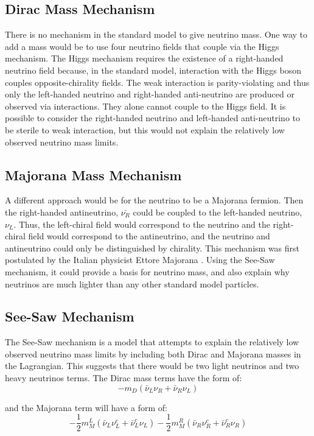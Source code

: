 \subsection{Dirac Mass Mechanism}
There is no mechanism in the standard model to give neutrino mass. One way to add a mass would be to use four neutrino fields that couple via the Higgs mechanism. The Higgs mechanism requires the existence of a right-handed neutrino field because, in the standard model, interaction with the Higgs boson couples opposite-chirality fields. The weak interaction is parity-violating and thus only the left-handed neutrino and right-handed anti-neutrino are produced or observed via interactions. They alone cannot couple to the Higgs field. It is possible to consider the right-handed neutrino and left-handed anti-neutrino to be sterile to weak interaction, but this would not explain the relatively low observed neutrino mass limits. 

\subsection{Majorana Mass Mechanism}
A different approach would be for the neutrino to be a Majorana fermion. Then the right-handed antineutrino, $\bar{\nu_R}$ could be coupled to the left-handed neutrino, $\nu_L$. Thus, the left-chiral field would correspond to the neutrino and the right-chiral field would correspond to the antineutrino, and the neutrino and antineutrino could only be distinguished by chirality. This mechanism was first postulated by the Italian physicist Ettore Majorana \cite{Majorana_1937}. Using the See-Saw mechanism, it could provide a basis for neutrino mass, and also explain why neutrinos are much lighter than any other standard model particles.


\subsection{See-Saw Mechanism}
The See-Saw mechanism is a model that attempts to explain the relatively low observed neutrino mass limits by including both Dirac and Majorana masses in the Lagrangian. This suggests that there would be two light neutrinos and two heavy neutrinos terms. The Dirac mass terms have the form of:
\begin{equation}\label{dirac_mass_terms}
-m_D(\bar{\nu}_L\nu_R+\bar{\nu}_R\nu_L)
\end{equation}

and the Majorana term will have a form of:
\begin{equation}\label{majorana_mass_terms}
-\frac{1}{2}m^L_M(\bar{\nu}_L\nu_L^c+\bar{\nu}_L^c\nu_L)-\frac{1}{2}m^R_M(\bar{\nu}_R\nu_R^c+\bar{\nu}_R^c\nu_R)
\end{equation}

